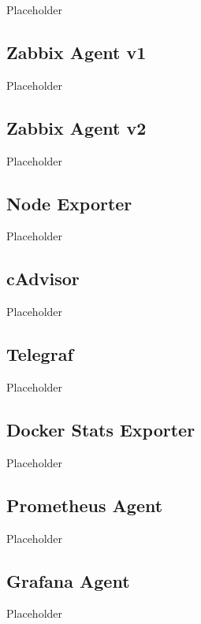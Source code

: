Placeholder

\subsection{Zabbix Agent v1}
\label{subsection:ZabbixAgentV1}

Placeholder

\subsection{Zabbix Agent v2}
\label{subsection:ZabbixAgentV2}

Placeholder

\subsection{Node Exporter}
\label{subsection:NodeExporter}

Placeholder

\subsection{cAdvisor}
\label{subsection:cAdvisor}

Placeholder

\subsection{Telegraf}
\label{subsection:Telegraf}

Placeholder

\subsection{Docker Stats Exporter}
\label{subsection:DockerStatsExporter}

Placeholder

\subsection{Prometheus Agent}
\label{subsection:PrometheusAgent}

Placeholder

\subsection{Grafana Agent}
\label{subsection:GrafanaAgent}

Placeholder

